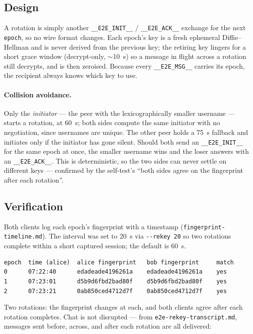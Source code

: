 \documentclass[11pt,a4paper]{article}
\begin{document}
\subsection{Design}

A rotation is simply another \texttt{\_\_E2E\_INIT\_\_} / \texttt{\_\_E2E\_ACK\_\_} exchange for the
next \texttt{epoch}, so no wire format changes. Each epoch's key is a fresh ephemeral Diffie--Hellman
and is never derived from the previous key; the retiring key lingers for a short grace window
(decrypt-only, $\sim$10~s) so a message in flight across a rotation still decrypts, and is then
zeroised. Because every \texttt{\_\_E2E\_MSG\_\_} carries its epoch, the recipient always knows which
key to use.

\paragraph{Collision avoidance.} Only the \emph{initiator} --- the peer with the lexicographically
smaller username --- starts a rotation, at 60~s; both sides compute the same initiator with no
negotiation, since usernames are unique. The other peer holds a 75~s fallback and initiates only if
the initiator has gone silent. Should both send an \texttt{\_\_E2E\_INIT\_\_} for the same epoch at
once, the smaller username wins and the loser answers with an \texttt{\_\_E2E\_ACK\_\_}. This is
deterministic, so the two sides can never settle on different keys --- confirmed by the self-test's
``both sides agree on the fingerprint after each rotation''.

\subsection{Verification}

Both clients log each epoch's fingerprint with a timestamp (\texttt{fingerprint-timeline.md}). The
interval was set to 20~s via \texttt{-{}-rekey~20} so two rotations complete within a short captured
session; the default is 60~s.

\begin{lstlisting}
epoch  time (alice)  alice fingerprint   bob fingerprint     match
0      07:22:40      edadeade4196261a    edadeade4196261a    yes
1      07:23:01      d5b9d6fbd2bad80f    d5b9d6fbd2bad80f    yes
2      07:23:21      0ab850ced4712d7f    0ab850ced4712d7f    yes
\end{lstlisting}

Two rotations: the fingerprint changes at each, and both clients agree after each rotation completes.
Chat is not disrupted --- from \texttt{e2e-rekey-transcript.md}, messages sent before, across, and
after each rotation are all delivered:
\end{document}
